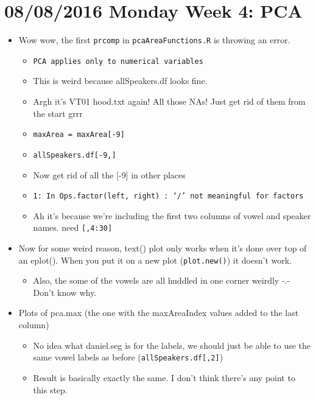 \documentclass{article}
\begin{document}
\section*{08/08/2016 Monday Week 4: PCA}
\begin{itemize}
    \item Wow wow, the first \verb|prcomp| in \verb|pcaAreaFunctions.R| is throwing an error.
    \begin{itemize}
        \item \verb|PCA applies only to numerical variables|
        \item This is weird because allSpeakers.df looks fine.
        \item Argh it's VT01 hood.txt again! All those NAs! Just get rid of them from the start grrr
        \item \verb|maxArea = maxArea[-9]|
        \item \verb|allSpeakers.df[-9,]|
        \item Now get rid of all the [-9] in other places
        \item \verb|1: In Ops.factor(left, right) : ‘/’ not meaningful for factors|
        \item Ah it's because we're including the first two columns of vowel and speaker names. need \verb|[,4:30]|
    \end{itemize}
    \item Now for some weird reason, text() plot only works when it's done over top of an eplot(). When you put it on a new plot (\verb|plot.new()|) it doesn't work.
    \begin{itemize}
        \item Also, the some of the vowels are all huddled in one corner weirdly -.- Don't know why.
    \end{itemize}
    \item Plots of pca.max (the one with the maxAreaIndex values added to the last column)
    \begin{itemize}
        \item No idea what daniel.seg is for the labels, we should just be able to use the same vowel labels as before (\verb|allSpeakers.df[,2]|)
        \item Result is basically exactly the same. I don't think there's any point to this step.
    \end{itemize}
\end{itemize}
\end{document}
